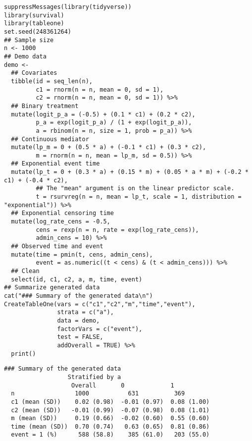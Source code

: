 \documentclass[10pt]{article}
\begin{document}
\scriptsize
\begin{verbatim}
suppressMessages(library(tidyverse))
library(survival)
library(tableone)
set.seed(248361264)
## Sample size
n <- 1000
## Demo data
demo <-
  ## Covariates
  tibble(id = seq_len(n),
         c1 = rnorm(n = n, mean = 0, sd = 1),
         c2 = rnorm(n = n, mean = 0, sd = 1)) %>%
  ## Binary treatment
  mutate(logit_p_a = (-0.5) + (0.1 * c1) + (0.2 * c2),
         p_a = exp(logit_p_a) / (1 + exp(logit_p_a)),
         a = rbinom(n = n, size = 1, prob = p_a)) %>%
  ## Continuous mediator
  mutate(lp_m = 0 + (0.5 * a) + (-0.1 * c1) + (0.3 * c2),
         m = rnorm(n = n, mean = lp_m, sd = 0.5)) %>%
  ## Exponential event time
  mutate(lp_t = 0 + (0.3 * a) + (0.15 * m) + (0.05 * a * m) + (-0.2 * c1) + (-0.4 * c2),
         ## The "mean" argument is on the linear predictor scale.
         t = rsurvreg(n = n, mean = lp_t, scale = 1, distribution = "exponential")) %>%
  ## Exponential censoring time
  mutate(log_rate_cens = -0.5,
         cens = rexp(n = n, rate = exp(log_rate_cens)),
         admin_cens = 10) %>%
  ## Observed time and event
  mutate(time = pmin(t, cens, admin_cens),
         event = as.numeric((t < cens) & (t < admin_cens))) %>%
  ## Clean
  select(id, c1, c2, a, m, time, event)
## Summarize generated data
cat("### Summary of the generated data\n")
CreateTableOne(vars = c("c1","c2","m","time","event"),
               strata = c("a"),
               data = demo,
               factorVars = c("event"),
               test = FALSE,
               addOverall = TRUE) %>%
  print()
\end{verbatim}

\begin{verbatim}
### Summary of the generated data
                  Stratified by a
                   Overall       0             1           
  n                 1000           631          369        
  c1 (mean (SD))    0.02 (0.98)  -0.01 (0.97)  0.08 (1.00) 
  c2 (mean (SD))   -0.01 (0.99)  -0.07 (0.98)  0.08 (1.01) 
  m (mean (SD))     0.19 (0.66)  -0.02 (0.60)  0.55 (0.60) 
  time (mean (SD))  0.70 (0.74)   0.63 (0.65)  0.81 (0.86) 
  event = 1 (%)      588 (58.8)    385 (61.0)   203 (55.0)
\end{verbatim}


\normalsize
\end{document}

